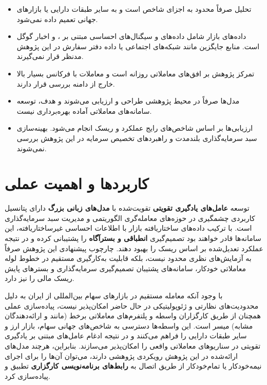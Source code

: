 \documentclass[12pt, a4paper]{report}
\begin{document}
\begin{itemize}
    \item تحلیل صرفاً محدود به اجزای شاخص  است و به سایر طبقات دارایی یا بازارهای جهانی تعمیم داده نمی‌شود.
    \item داده‌های بازار شامل داده‌های  و سیگنال‌های احساسی مبتنی بر  \cite{araci2019finbert}،  \cite{yang2023fingpt} و اخبار گوگل است. منابع جایگزین مانند شبکه‌های اجتماعی یا داده دفتر سفارش در این پژوهش مدنظر قرار نمی‌گیرند.
    \item تمرکز پژوهش بر افق‌های معاملاتی روزانه است و معاملات با فرکانس بسیار بالا خارج از دامنه بررسی قرار دارند.
    \item مدل‌ها صرفاً در محیط پژوهشی طراحی و ارزیابی می‌شوند و هدف، توسعه سامانه‌های معاملاتی آماده بهره‌برداری نیست.
\item ارزیابی‌ها بر اساس شاخص‌های رایج عملکرد و ریسک انجام می‌شود. بهینه‌سازی سبد سرمایه‌گذاری بلندمدت و راهبردهای تخصیص سرمایه در این پژوهش بررسی نمی‌شوند.
\end{itemize}




\section{کاربردها و اهمیت عملی}

توسعه \textbf{عامل‌های یادگیری تقویتی} تقویت‌شده با \textbf{مدل‌های زبانی بزرگ} دارای پتانسیل کاربردی چشمگیری در حوزه‌های معامله‌گری الگوریتمی و مدیریت سبد سرمایه‌گذاری است. با ترکیب داده‌های ساختاریافته بازار با اطلاعات احساسی غیرساختاریافته، این سامانه‌ها قادر خواهند بود تصمیم‌گیری \textbf{انطباقی و بسترآگاه} را پشتیبانی کرده و در نتیجه عملکرد تعدیل‌شده بر اساس ریسک را بهبود دهند.  
چارچوب پیشنهادی این پژوهش صرفاً به آزمایش‌های نظری محدود نیست، بلکه قابلیت به‌کارگیری مستقیم در خطوط لوله معاملاتی خودکار، سامانه‌های پشتیبان تصمیم‌گیری سرمایه‌گذاری و بسترهای پایش ریسک مالی را نیز دارد.

با وجود آنکه معامله مستقیم در بازارهای سهام بین‌المللی از ایران به دلیل محدودیت‌های نظارتی و ژئوپولیتیکی در حال حاضر امکان‌پذیر نیست، پیاده‌سازی عملی همچنان از طریق کارگزاران واسطه و پلتفرم‌های معاملاتی برخط (مانند  و ارائه‌دهندگان مشابه) میسر است. این واسطه‌ها دسترسی به شاخص‌های جهانی سهام، بازار ارز و سایر طبقات دارایی را فراهم می‌کنند و در نتیجه ادغام عامل‌های مبتنی بر یادگیری تقویتی در سناریوهای معاملاتی واقعی را امکان‌پذیر می‌سازند. بنابراین، هرچند مدل‌های ارائه‌شده در این پژوهش رویکردی پژوهشی دارند، می‌توان آن‌ها را برای اجرای نیمه‌خودکار یا تمام‌خودکار از طریق اتصال به \textbf{رابط‌های برنامه‌نویسی کارگزاری} تطبیق و پیاده‌سازی کرد.
\end{document}
